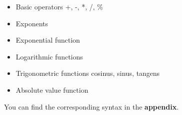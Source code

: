 {\begin{itemize}
    \item Basic operators +, -, *, /, \%
    
    \item Exponents
    
    \item Exponential function
    \item Logarithmic functions
    \item Trigonometric functions cosinus, sinus, tangens
    \item Absolute value function
\end{itemize}

You can find the corresponding syntax in the \textbf{appendix}.\newline












}
